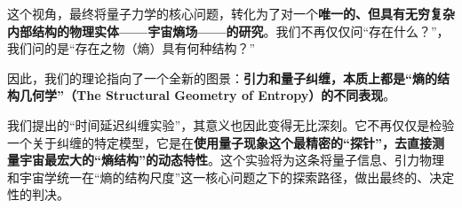 \documentclass[12pt]{article}
\begin{document}
\noindent 这个视角，最终将量子力学的核心问题，转化为了对一个\textbf{唯一的、但具有无穷复杂内部结构的物理实体——宇宙熵场——的研究}。我们不再仅仅问``存在什么？''，我们问的是``存在之物（熵）具有何种结构？''

\noindent 因此，我们的理论指向了一个全新的图景：\textbf{引力和量子纠缠，本质上都是``熵的结构几何学''（The Structural Geometry of Entropy）的不同表现}。

\noindent 我们提出的``时间延迟纠缠实验''，其意义也因此变得无比深刻。它不再仅仅是检验一个关于纠缠的特定模型，它是在\textbf{使用量子现象这个最精密的``探针''，去直接测量宇宙最宏大的``熵结构''的动态特性}。这个实验将为这条将量子信息、引力物理和宇宙学统一在``熵的结构尺度''这一核心问题之下的探索路径，做出最终的、决定性的判决。
\end{document}
